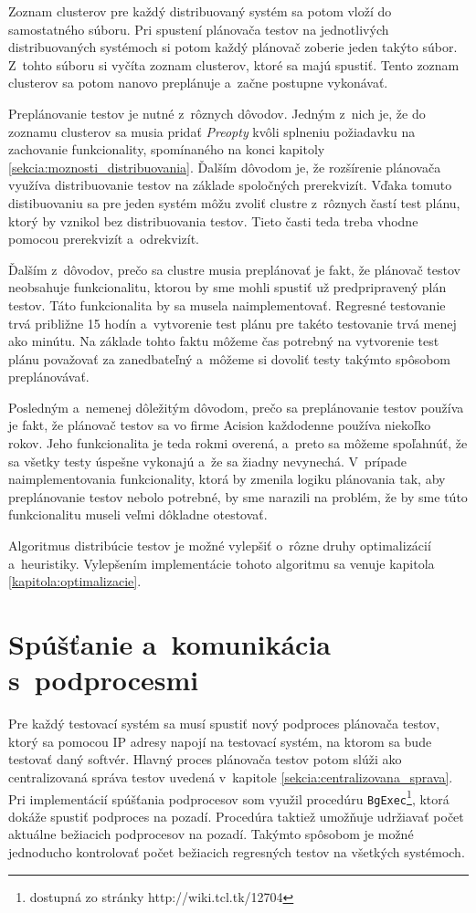 Zoznam clusterov pre každý distribuovaný systém sa potom vloží do 
samostatného súboru. Pri spustení plánovača testov na jednotlivých 
distribuovaných systémoch si potom každý plánovač zoberie jeden 
takýto súbor. Z~tohto súboru si vyčíta zoznam clusterov, ktoré sa 
majú spustiť. Tento zoznam clusterov sa potom nanovo preplánuje a~začne 
postupne vykonávať.

Preplánovanie testov je nutné z~rôznych dôvodov. Jedným z~nich je, 
že do zoznamu clusterov sa musia pridať \textit{Preopty} kvôli splneniu 
požiadavku na zachovanie funkcionality, spomínaného na konci kapitoly 
\ref{sekcia:moznosti_distribuovania}. 
Ďalším dôvodom je, že rozšírenie plánovača využíva distribuovanie testov 
na základe spoločných prerekvizít. 
Vďaka tomuto distibuovaniu sa pre jeden systém môžu zvoliť clustre 
z~rôznych častí test plánu, ktorý by vznikol bez distribuovania testov.
Tieto časti teda treba vhodne  pomocou prerekvizít 
a~odrekvizít. 

Ďalším z~dôvodov, prečo sa clustre musia preplánovať je fakt, že 
plánovač testov neobsahuje funkcionalitu, ktorou by sme mohli spustiť 
už predpripravený plán testov. Táto funkcionalita by sa musela 
naimplementovať. Regresné testovanie trvá približne 15 hodín 
a~vytvorenie test plánu pre takéto testovanie trvá menej ako minútu.
Na základe tohto faktu môžeme čas potrebný na vytvorenie test plánu 
považovať za zanedbateľný a~môžeme si dovoliť testy takýmto spôsobom 
preplánovávať.

Posledným a~nemenej dôležitým dôvodom, prečo sa preplánovanie testov 
používa je fakt, že plánovač testov sa vo firme Acision každodenne 
používa niekoľko rokov.
Jeho funkcionalita je teda rokmi overená, a~preto sa môžeme spoľahnúť, 
že sa všetky testy úspešne vykonajú a~že sa žiadny nevynechá.
V~prípade naimplementovania funkcionality, ktorá by zmenila logiku 
plánovania tak, aby preplánovanie testov nebolo potrebné, by sme narazili 
na problém, že by sme túto funkcionalitu museli veľmi dôkladne otestovať. 

Algoritmus distribúcie testov je možné vylepšiť o~rôzne druhy 
optimalizácií a~heuristiky. Vylepšením implementácie tohoto algoritmu 
sa venuje kapitola \ref{kapitola:optimalizacie}. 


\section{Spúšťanie a~komunikácia s~podprocesmi}
\label{sekcia:spustanie_podprocesov}
Pre každý testovací systém sa musí spustiť nový podproces plánovača 
testov, ktorý sa pomocou IP adresy napojí na testovací systém, 
na ktorom sa bude testovať daný softvér. Hlavný proces plánovača testov 
potom slúži ako centralizovaná správa testov uvedená
v~kapitole \ref{sekcia:centralizovana_sprava}.
Pri implementácií spúšťania podprocesov som využil procedúru 
\texttt{BgExec}\footnote{dostupná zo stránky http://wiki.tcl.tk/12704},
ktorá dokáže spustiť podproces na pozadí. Procedúra taktiež umožňuje 
udržiavať počet aktuálne bežiacich podprocesov na pozadí.
Takýmto spôsobom je možné jednoducho kontrolovať počet bežiacich 
regresných testov na všetkých systémoch.

